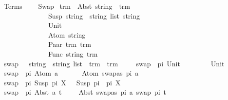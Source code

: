 %
\begin{isabellebody}%
%
%
\isadelimtheory
%
\endisadelimtheory
%
\isatagtheory
{}\isamarkupfalse%
\ Terms\ \isanewline
\ \ \ Swap\isanewline
{}%
\endisatagtheory
{\isafoldtheory}%
%
\isadelimtheory
\isanewline
%
\endisadelimtheory
\isanewline
\isanewline
\isanewline
{}\isamarkupfalse%
\ trm\ {\isacharequal}{\kern0pt}\ Abst\ string\ \ trm\ \ \ \isanewline
\ \ \ \ \ \ \ \ \ \ \ \ \ {\isacharbar}{\kern0pt}\ Susp\ {\isachardoublequoteopen}{\isacharparenleft}{\kern0pt}string\ {\isasymtimes}\ string{\isacharparenright}{\kern0pt}\ list{\isachardoublequoteclose}\ string\isanewline
\ \ \ \ \ \ \ \ \ \ \ \ \ {\isacharbar}{\kern0pt}\ Unit\ \ \ \ \ \ \ \ \ \ \ \ \ \ \ \ \ \ \ \ \ \ \ \ \ \ \ \ \ \ \ \ \ \ \ \isanewline
\ \ \ \ \ \ \ \ \ \ \ \ \ {\isacharbar}{\kern0pt}\ Atom\ string\ \ \ \ \ \ \ \ \ \ \ \ \ \ \ \ \ \ \ \ \ \ \ \ \ \ \ \isanewline
\ \ \ \ \ \ \ \ \ \ \ \ \ {\isacharbar}{\kern0pt}\ Paar\ trm\ trm\ \ \ \ \ \ \ \ \ \ \ \ \ \ \ \ \ \ \ \ \ \ \ \ \ \ \isanewline
\ \ \ \ \ \ \ \ \ \ \ \ \ {\isacharbar}{\kern0pt}\ Func\ string\ trm\ \ \ \ \ \ \ \ \ \ \ \ \ \ \ \ \ \ \ \ \ \ \ \isanewline
\isanewline
\isanewline
\isanewline
{}\isamarkupfalse%
\ swap\ \ {\isacharcolon}{\kern0pt}{\isacharcolon}{\kern0pt}\ {\isachardoublequoteopen}{\isacharparenleft}{\kern0pt}string\ {\isasymtimes}\ string{\isacharparenright}{\kern0pt}\ list\ {\isasymRightarrow}\ trm\ {\isasymRightarrow}\ trm{\isachardoublequoteclose}\isanewline
\ \ \isanewline
\ \ {\isachardoublequoteopen}swap\ \ pi\ {\isacharparenleft}{\kern0pt}Unit{\isacharparenright}{\kern0pt}\ \ \ \ \ \ \ \ {\isacharequal}{\kern0pt}\ Unit{\isachardoublequoteclose}\ \isanewline
{\isacharbar}{\kern0pt}\ {\isachardoublequoteopen}swap\ \ pi\ {\isacharparenleft}{\kern0pt}Atom\ a{\isacharparenright}{\kern0pt}\ \ \ \ \ \ {\isacharequal}{\kern0pt}\ Atom\ {\isacharparenleft}{\kern0pt}swapas\ pi\ a{\isacharparenright}{\kern0pt}{\isachardoublequoteclose}\isanewline
{\isacharbar}{\kern0pt}\ {\isachardoublequoteopen}swap\ \ pi\ {\isacharparenleft}{\kern0pt}Susp\ pi{\isacharprime}{\kern0pt}\ X{\isacharparenright}{\kern0pt}\ \ {\isacharequal}{\kern0pt}\ Susp\ {\isacharparenleft}{\kern0pt}pi\ {\isacharat}{\kern0pt}\ pi{\isacharprime}{\kern0pt}{\isacharparenright}{\kern0pt}\ X{\isachardoublequoteclose}\isanewline
{\isacharbar}{\kern0pt}\ {\isachardoublequoteopen}swap\ \ pi\ {\isacharparenleft}{\kern0pt}Abst\ a\ t{\isacharparenright}{\kern0pt}\ \ \ \ {\isacharequal}{\kern0pt}\ Abst\ {\isacharparenleft}{\kern0pt}swapas\ pi\ a{\isacharparenright}{\kern0pt}\ {\isacharparenleft}{\kern0pt}swap\ pi\ t{\isacharparenright}{\kern0pt}{\isachardoublequoteclose}\isanewline

\end{isabellebody}
